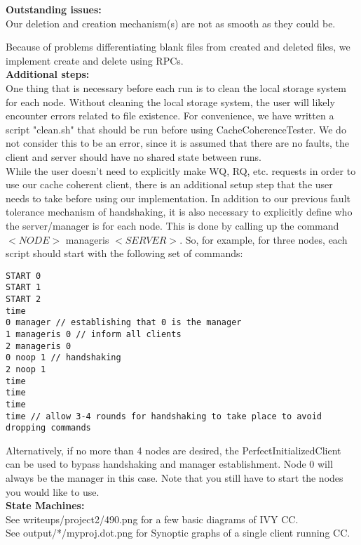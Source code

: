 \documentclass[11pt]{article}
\begin{document}
\textbf{Outstanding issues:} \\

Our deletion and creation mechanism(s) are not as smooth as they could be.

Because of problems differentiating blank files from created and deleted files, we implement create and delete using RPCs. \\

\textbf{Additional steps:} \\

One thing that is necessary before each run is to clean the local storage system for each node. Without cleaning the local storage system, the user will likely encounter errors related to file existence. For convenience, we have written a script "clean.sh" that should be run before using CacheCoherenceTester. We do not consider this to be an error, since it is assumed that there are no faults, the client and server should have no shared state between runs. \\

While the user doesn’t need to explicitly make WQ, RQ, etc. requests in order to use our cache coherent client, there is an additional setup step 
that the user needs to take before using our implementation. In addition to our previous fault tolerance mechanism of handshaking, it is also necessary 
to explicitly define who the server/manager is for each node. This is done by calling up the command $<NODE>$ manageris $<SERVER>$. So, for example, for three 
nodes, each script should start with the following set of commands:\\

\begin{verbatim}
START 0
START 1
START 2
time
0 manager // establishing that 0 is the manager
1 manageris 0 // inform all clients
2 manageris 0
0 noop 1 // handshaking
2 noop 1
time
time
time
time // allow 3-4 rounds for handshaking to take place to avoid dropping commands
\end{verbatim}

Alternatively, if no more than 4 nodes are desired, the PerfectInitializedClient can be used to bypass handshaking and manager establishment.
Node 0 will always be the manager in this case. Note that you still have to start the nodes you would like to use. \\

\textbf{State Machines:} \\

See writeups/project2/490.png for a few basic diagrams of IVY CC. \\
See output/*/myproj.dot.png for Synoptic graphs of a single client running CC. \\
\end{document}
